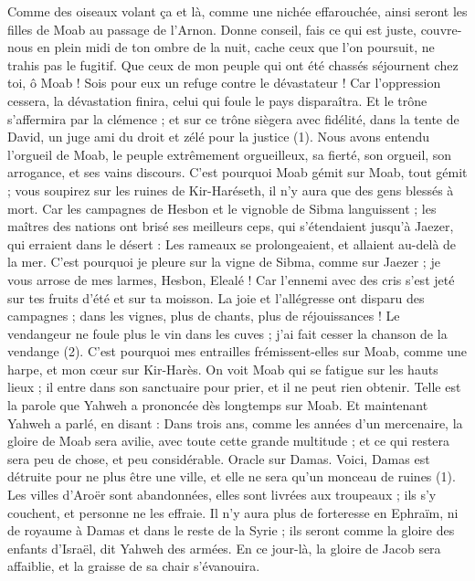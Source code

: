 \begin{multicols}{2}
{Comme des oiseaux volant ça et là, comme une nichée effarouchée, ainsi seront les filles de Moab au passage de l’Arnon.
Donne conseil, fais ce qui est juste, couvre-nous en plein midi de ton ombre de la nuit, cache ceux que l’on poursuit, ne trahis pas le fugitif.
Que ceux de mon peuple qui ont été chassés séjournent chez toi, ô Moab ! Sois pour eux un refuge contre le dévastateur ! Car l’oppression cessera, la dévastation finira, celui qui foule le pays disparaîtra.
Et le trône s’affermira par la clémence ; et sur ce trône siègera avec fidélité, dans la tente de David, un juge ami du droit et zélé pour la justice (1).
Nous avons entendu l'orgueil de Moab, le peuple extrêmement orgueilleux, sa fierté, son orgueil, son arrogance, et ses vains discours.
C'est pourquoi Moab gémit sur Moab, tout gémit ; vous soupirez sur les ruines de Kir-Haréseth, il n'y aura que des gens blessés à mort.
Car les campagnes de Hesbon et le vignoble de Sibma languissent ; les maîtres des nations ont brisé ses meilleurs ceps, qui s’étendaient jusqu’à Jaezer, qui erraient dans le désert : Les rameaux se prolongeaient, et allaient au-delà de la mer.
C'est pourquoi je pleure sur la vigne de Sibma, comme sur Jaezer ; je vous arrose de mes larmes, Hesbon, Elealé ! Car l'ennemi avec des cris s'est jeté sur tes fruits d'été et sur ta moisson.
La joie et l’allégresse ont disparu des campagnes ; dans les vignes, plus de chants, plus de réjouissances ! Le vendangeur ne foule plus le vin dans les cuves ; j’ai fait cesser la chanson de la vendange (2).
C'est pourquoi mes entrailles frémissent-elles sur Moab, comme une harpe, et mon cœur sur Kir-Harès.
On voit Moab qui se fatigue sur les hauts lieux ; il entre dans son sanctuaire pour prier, et il ne peut rien obtenir.
Telle est la parole que Yahweh a prononcée dès longtemps sur Moab.
Et maintenant Yahweh a parlé, en disant : Dans trois ans, comme les années d’un mercenaire, la gloire de Moab sera avilie, avec toute cette grande multitude ; et ce qui restera sera peu de chose, et peu considérable.
\VerseOne{}Oracle sur Damas. Voici, Damas est détruite pour ne plus être une ville, et elle ne sera qu'un monceau de ruines (1).
Les villes d'Aroër sont abandonnées, elles sont livrées aux troupeaux ; ils s’y couchent, et personne ne les effraie.
Il n'y aura plus de forteresse en Ephraïm, ni de royaume à Damas et dans le reste de la Syrie ; ils seront comme la gloire des enfants d'Israël, dit Yahweh des armées.
En ce jour-là, la gloire de Jacob sera affaiblie, et la graisse de sa chair s’évanouira.
}
\end{multicols}
